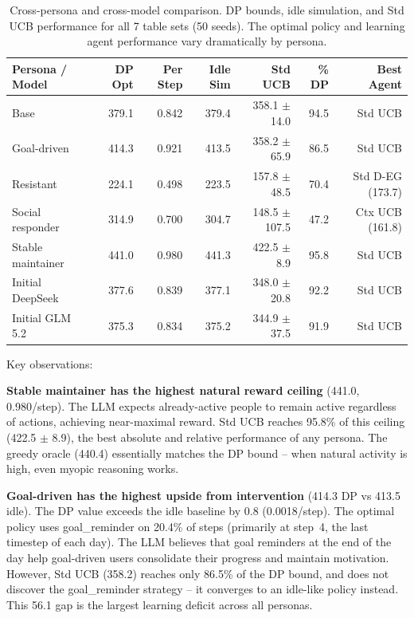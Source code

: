 \documentclass[11pt]{article}
\begin{document}
\begin{table}[h]
\centering
\begin{tabular}{lrrrrrr}
\toprule
Persona / Model & DP Opt & Per Step & Idle Sim & Std UCB & \% DP & Best Agent \\
\midrule
Base & 379.1 & 0.842 & 379.4 & 358.1 $\pm$ 14.0 & 94.5 & Std UCB \\
Goal-driven & 414.3 & 0.921 & 413.5 & 358.2 $\pm$ 65.9 & 86.5 & Std UCB \\
Resistant & 224.1 & 0.498 & 223.5 & 157.8 $\pm$ 48.5 & 70.4 & Std D-EG (173.7) \\
Social responder & 314.9 & 0.700 & 304.7 & 148.5 $\pm$ 107.5 & 47.2 & Ctx UCB (161.8) \\
Stable maintainer & 441.0 & 0.980 & 441.3 & 422.5 $\pm$ 8.9 & 95.8 & Std UCB \\
Initial DeepSeek & 377.6 & 0.839 & 377.1 & 348.0 $\pm$ 20.8 & 92.2 & Std UCB \\
Initial GLM 5.2 & 375.3 & 0.834 & 375.2 & 344.9 $\pm$ 37.5 & 91.9 & Std UCB \\
\bottomrule
\end{tabular}
\caption{Cross-persona and cross-model comparison. DP bounds, idle simulation, and Std UCB performance for all 7 table sets (50 seeds). The optimal policy and learning agent performance vary dramatically by persona.}
\label{tab:cross_persona}
\end{table}

Key observations:

\textbf{Stable maintainer has the highest natural reward ceiling} (441.0, 0.980/step). The LLM expects already-active people to remain active regardless of actions, achieving near-maximal reward. Std UCB reaches 95.8\% of this ceiling (422.5 $\pm$ 8.9), the best absolute and relative performance of any persona. The greedy oracle (440.4) essentially matches the DP bound -- when natural activity is high, even myopic reasoning works.

\textbf{Goal-driven has the highest upside from intervention} (414.3 DP vs 413.5 idle). The DP value exceeds the idle baseline by 0.8 (0.0018/step). The optimal policy uses goal\_reminder on 20.4\% of steps (primarily at step~4, the last timestep of each day). The LLM believes that goal reminders at the end of the day help goal-driven users consolidate their progress and maintain motivation. However, Std UCB (358.2) reaches only 86.5\% of the DP bound, and does not discover the goal\_reminder strategy -- it converges to an idle-like policy instead. This 56.1 gap is the largest learning deficit across all personas.
\end{document}
